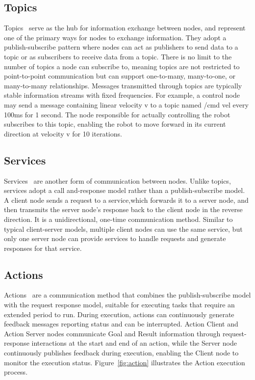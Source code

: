 \subsection{Topics}
Topics~\cite{ros2topics} serve as the hub for information exchange between nodes, and represent one of the primary ways for nodes to exchange information. They adopt a publish-subscribe pattern where nodes can act as publishers to send data to a topic or as subscribers to receive data from a topic. There is no limit to the number of topics a node can subscribe to, meaning topics are not restricted to point-to-point communication but can support one-to-many, many-to-one, or many-to-many relationships. Messages transmitted through topics are typically stable information streams with fixed frequencies. For example, a control node may send a message containing linear velocity v to a topic named /cmd vel every 100ms for 1 second. The node responsible for actually controlling the robot subscribes to this topic, enabling the robot to move forward in its current direction at velocity v for 10 iterations.

\subsection{Services}
Services~\cite{ros2services} are another form of communication between nodes. Unlike topics, services adopt a call and-response model rather than a publish-subscribe model. A client node sends a request to a service,which forwards it to a server node, and then transmits the server node's response back to the client node in the reverse direction. It is a unidirectional, one-time communication method. Similar to typical client-server models, multiple client nodes can use the same service, but only one server node can provide services to handle requests and generate responses for that service.

\subsection{Actions}
Actions~\cite{ros2actions} are a communication method that combines the publish-subscribe model with the request response model, suitable for executing tasks that require an extended period to run. During execution, actions can continuously generate feedback messages reporting status and can be interrupted. Action Client and Action Server nodes communicate Goal and Result information through request-response interactions at the start and end of an action, while the Server node continuously publishes feedback during execution, enabling the Client node to monitor the execution status. Figure~\ref{fig:action} illustrates the Action execution process.

